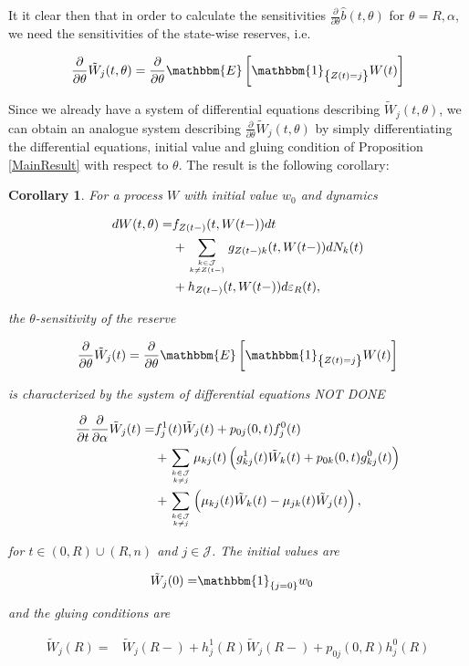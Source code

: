 \documentclass{book}
\newcommand{\1}[1]{\mathbbm{1}_{\left\lbrace #1 \right\rbrace}}
\newcommand{\expec}[1][def]{\mathbbm{E} \left[ #1 \right]}
\theoremstyle{break}
\newtheorem{corollary}[definition]{Corollary}
\theoremstyle{remark}
\numberwithin{equation}{section}
\begin{document}
It it clear then that in order to calculate the sensitivities $\frac{\partial}{\partial \theta} \hat{b}(t,\theta)$ for $\theta=R,\alpha$, we need the sensitivities of the state-wise reserves, i.e.

\begin{align*}
	\frac{\partial}{\partial \theta} \tilde{W}_j(t,\theta) = \frac{\partial}{\partial \theta} \expec[\1{Z(t)=j} W(t)]
\end{align*}

Since we already have a system of differential equations describing $\tilde{W}_j(t,\theta)$, we can obtain an analogue system describing $\frac{\partial}{\partial \theta} \tilde{W}_j(t,\theta)$ by simply differentiating the differential equations, initial value and gluing condition of Proposition \ref{MainResult} with respect to $\theta$. The result is the following corollary:

\begin{corollary} \label{Corollary}
	For a process $W$ with initial value $w_0$ and dynamics
	
	\begin{align*}
		dW(t,\theta) =& f_{Z(t-)}(t,W(t-)) dt \\
		&+ \sum_{k \in \mathcal{J} \atop k \neq Z(t-)} g_{Z(t-)k}(t,W(t-)) dN_{k}(t) \\
		&+ h_{Z(t-)}(t,W(t-)) d \varepsilon_R(t),
	\end{align*}

	the $\theta$-sensitivity of the reserve
	
	\begin{align*}
		\frac{\partial}{\partial \theta} \tilde{W}_j(t) = \frac{\partial}{\partial \theta} \expec[\1{Z(t)=j} W(t)]
	\end{align*}
	
	is characterized by the system of differential equations NOT DONE
	
	\begin{align*}
		\frac{\partial}{\partial t} \frac{\partial}{\partial \alpha} \tilde{W}_j(t) =& f_j^1(t) \tilde{W}_j(t) + p_{0j}(0,t) f_j^0(t) \\
		&+ \sum_{k \in \mathcal{J} \atop k \neq j} \mu_{kj}(t) \left( g_{kj}^1(t) \tilde{W}_k(t) + p_{0k}(0,t) g_{kj}^0(t) \right) \\
		&+ \sum_{k \in \mathcal{J} \atop k \neq j} \left( \mu_{kj}(t) \tilde{W}_k(t) - \mu_{jk}(t) \tilde{W}_j(t) \right),
	\end{align*}
	
	for $t \in (0,R)\cup(R,n)$ and $j \in \mathcal{J}$. The initial values are
	
	\begin{align*}
		\tilde{W}_j(0) =& \1{j=0} w_0
	\end{align*}
	
	and the gluing conditions are
	
	\begin{align*}
		\tilde{W}_j(R) =& \tilde{W}_j(R-) + h_j^1(R) \tilde{W}_j(R-) + p_{0j}(0,R) h_j^0(R)
	\end{align*}
\end{corollary}
\end{document}
